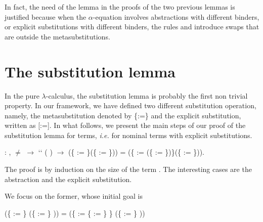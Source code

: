 In fact, the need of the lemma  in the proofs of the two previous lemmas is justified because when the $\alpha$-equation involves abstractions with different binders, or explicit substitutions with different binders, the rules  and  introduce swaps that are outside the metasubstitutions. 
\begin{coqdoccode}
\coqdocemptyline
\coqdocemptyline
\end{coqdoccode}
\section{The substitution lemma}



 In the pure $\lambda$-calculus, the substitution lemma is probably the first non trivial property. In our framework, we have defined two different substitution operation, namely, the metasubstitution denoted by \{:=\} and the explicit substitution, written as [:=]. In what follows, we present the main steps of our proof of the substitution lemma for  terms, {\it i.e.} for nominal terms with explicit substitutions. 
\begin{coqdoccode}
\coqdocemptyline
\coqdocnoindent
{} : \coqdockw{\ensuremath{\forall}}     ,  \ensuremath{\not=}  \ensuremath{\rightarrow}  `` ( ) \ensuremath{\rightarrow}\coqdoceol
\coqdocindent{10.50em}
(\{ := \}(\{ := \})) = (\{ := (\{ := \})\}(\{ := \})).\coqdoceol
\end{coqdoccode}
 The proof is by induction on the size of the term . The interesting cases are the abstraction and the explicit substitution.
\begin{coqdoccode}
\end{coqdoccode}
We focus on the former, whose initial goal is


(\{ := \} (\{ := \}   )) = (\{ := \{ := \} \} (\{ := \}   ))


